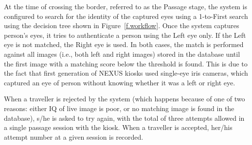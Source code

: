 \documentclass{cta-author}%
\newcommand{\cmt}[1]{}
\begin{document}



\cmt{
The workflow and the decision logic of the NEXUS kiosks of the first generation are summarized in 
Figure \ref{f.workflow}. 
}


At the time of crossing the border, referred to as the Passage stage, 
the system is configured to search for the identity of the captured eyes using a 1-to-First search using the decision tree shown in 
 Figure~\ref{f.workflow}. 
Once the system captures person's eyes, it tries to authenticate a person using the Left eye only. If the Left eye is not matched, the Right eye is used. In both cases, the match is performed against all images (i.e., both left and right images) stored in the database  until the first image with a matching score below the threshold is found.
 This is due to the fact that first generation of NEXUS kiosks used single-eye iris cameras, which captured  an eye of person without knowing whether it was a left or right eye. 


When a traveller is rejected by the system (which happens because of one of two reasons: either IQ of live image is poor, or no matching image is found in the database), s/he is asked to try again, with the total of three  attempts  allowed in a single passage session with the kiosk. When a traveller is accepted, her/his attempt number at a given session is recorded.
\end{document}
